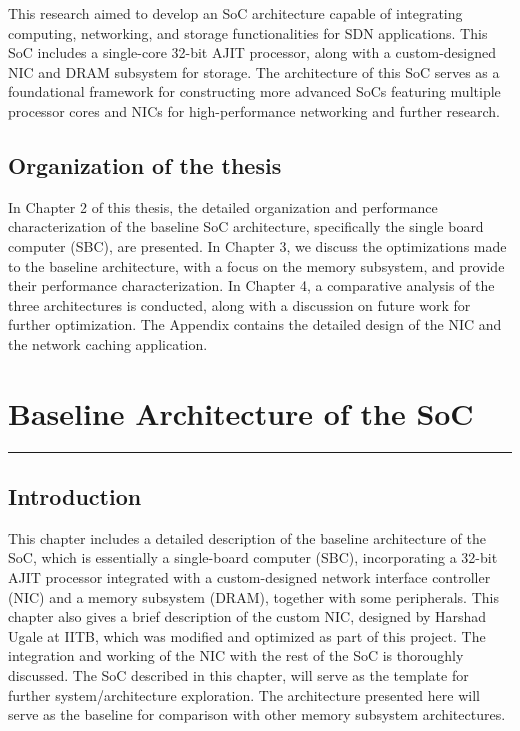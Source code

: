 \documentclass[12pt]{report}
\begin{document}
This research aimed to develop an SoC architecture capable of integrating computing, networking, and storage functionalities for SDN applications. This SoC includes a single-core 32-bit AJIT processor, along with a custom-designed NIC and DRAM subsystem for storage.
The architecture of this SoC serves as a foundational framework for constructing more advanced SoCs featuring multiple processor cores and NICs for high-performance networking and further research. \\

\section{Organization of the thesis}
In Chapter 2 of this thesis, the detailed organization and performance characterization of the baseline SoC architecture, specifically the single board computer (SBC), are presented. In Chapter 3, we discuss the optimizations made to the baseline architecture, with a focus on the memory subsystem, and provide their performance characterization. In Chapter 4, a comparative analysis of the three architectures is conducted, along with a discussion on future work for further optimization. The Appendix contains the detailed design of the NIC and the network caching application.












\newpage
\chapter{Baseline Architecture of the SoC}
\rule[10pt]{\linewidth}{3pt}
\section{Introduction}

This chapter includes a detailed description of the baseline architecture of the SoC, which is essentially a single-board computer (SBC), incorporating a 32-bit AJIT processor integrated with a custom-designed network interface controller (NIC) and a memory subsystem (DRAM), together with some peripherals.
This chapter also gives a brief description of the custom NIC, designed by Harshad Ugale at IITB, which was modified and optimized as part of this project. The integration and working of the NIC with the rest of the SoC is thoroughly discussed. The SoC described in this chapter, will serve as the template for further system/architecture exploration. The architecture presented here will serve as the baseline for comparison with other memory subsystem architectures.
\end{document}
